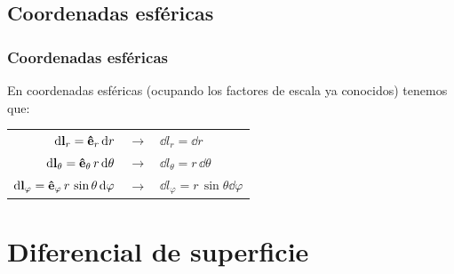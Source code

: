 \documentclass[12pt]{beamer}
\begin{document}
\subsection*{Coordenadas esféricas}
\begin{frame}
\frametitle{Coordenadas esféricas}
En coordenadas esféricas (ocupando los factores de escala ya conocidos) tenemos que:
\begin{table}
\begin{tabular}{r  c  l}
$\dd{\vb{l}_{r}} = \vu{e}_{r} \dd{r}$ & $\longrightarrow$ & $\dd{l_{r}} = \dd{r}$ \\
$\dd{\vb{l}_{\theta}} = \vu{e}_{\theta} \, r \dd{\theta}$ & $\longrightarrow$ & $\dd{l_{\theta}} = r \, \dd{\theta}$ \\
$\dd{\vb{l}_{\varphi}} = \vu{e}_{\varphi} \, r \, \sin \theta \dd{\varphi}$ & $\longrightarrow$ & $\dd{l_{\varphi}} = r \, \sin \theta \dd{\varphi}$ \\
\end{tabular}
\end{table}
\end{frame}
\section{Diferencial de superficie}
\end{document}
